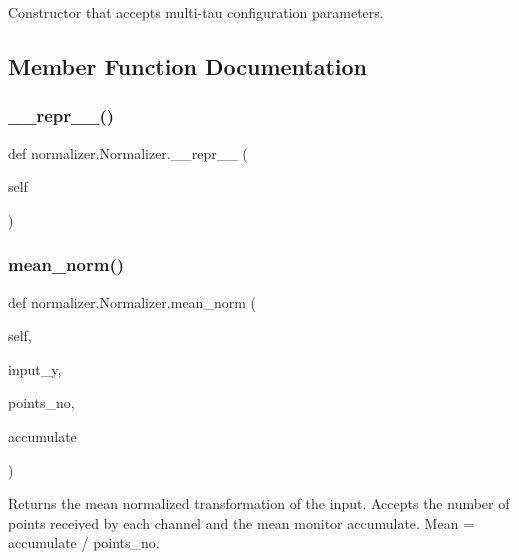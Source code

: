 \begin{DoxyVerb}Constructor that accepts multi-tau configuration parameters.
\end{DoxyVerb}
 

\subsection{Member Function Documentation}
\mbox{\label{classnormalizer_1_1Normalizer_a09b6d62bec3fca383a1a9c82cc74836a}} 
\subsubsection{\texorpdfstring{\+\_\+\+\_\+repr\+\_\+\+\_\+()}{\_\_repr\_\_()}}
{\footnotesize\ttfamily def normalizer.\+Normalizer.\+\_\+\+\_\+repr\+\_\+\+\_\+ (\begin{DoxyParamCaption}\item[{}]{self }\end{DoxyParamCaption})}

\mbox{\label{classnormalizer_1_1Normalizer_ac9530ba0efaa543756ecfef0e871b63e}} 
\subsubsection{\texorpdfstring{mean\+\_\+norm()}{mean\_norm()}}
{\footnotesize\ttfamily def normalizer.\+Normalizer.\+mean\+\_\+norm (\begin{DoxyParamCaption}\item[{}]{self,  }\item[{}]{input\+\_\+y,  }\item[{}]{points\+\_\+no,  }\item[{}]{accumulate }\end{DoxyParamCaption})}

\begin{DoxyVerb}Returns the mean normalized transformation of the input. Accepts the number of points received by each 
channel and the mean monitor accumulate. Mean = accumulate / points_no.
\end{DoxyVerb}
 \mbox{\label{classnormalizer_1_1Normalizer_a7965c29d7d3a867dbb82cc7f3e7e69b3}} 
